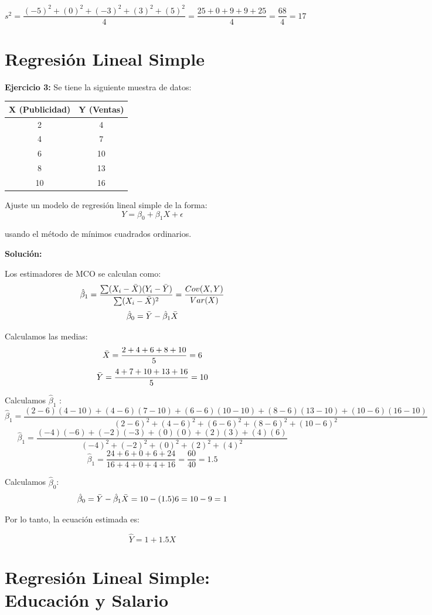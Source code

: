 \documentclass[10pt,a4paper]{article}
\begin{document}
$$s^2 = \frac{(-5)^2+(0)^2 + (-3)^2 +(3)^2 + (5)^2}{4} = \frac{25+0+9+9+25}{4} = \frac{68}{4} = 17$$



\section{Regresión Lineal Simple}

\textbf{Ejercicio 3:} Se tiene la siguiente muestra de datos:
\begin{center}
\begin{tabular}{|c|c|}
\hline
X (Publicidad) & Y (Ventas) \\
\hline
2 & 4 \\
\hline
4 & 7 \\
\hline
6 & 10 \\
\hline
8 & 13 \\
\hline
10 & 16 \\
\hline
\end{tabular}
\end{center}

Ajuste un modelo de regresión lineal simple de la forma:
$$Y = \beta_0 + \beta_1 X + \epsilon $$

usando el método de mínimos cuadrados ordinarios.

\textbf{Solución:}

Los estimadores de MCO se calculan como:
$$\hat{\beta}_1 = \frac{\sum (X_i - \Bar{X})(Y_i - \Bar{Y})}{\sum (X_i - \Bar{X})^2} = \frac{Cov(X,Y)}{Var(X)} $$
$$\hat{\beta}_0  = \Bar{Y} - \hat{\beta}_1 \Bar{X}$$

Calculamos las medias:
$$\Bar{X} = \frac{2+4+6+8+10}{5}=6$$ 
$$\Bar{Y} = \frac{4+7+10+13+16}{5} = 10$$

Calculamos $\hat{\beta}_1$ :
$$\hat{\beta}_1 = \frac{(2-6)(4-10)+(4-6)(7-10)+(6-6)(10-10)+(8-6)(13-10) + (10-6)(16-10)}{(2-6)^2+(4-6)^2+(6-6)^2+(8-6)^2+(10-6)^2}$$
$$\hat{\beta}_1 = \frac{(-4)(-6)+(-2)(-3)+(0)(0)+(2)(3)+(4)(6)}{(-4)^2+(-2)^2+(0)^2+(2)^2+(4)^2}$$
$$\hat{\beta}_1 = \frac{24+6+0+6+24}{16+4+0+4+16}= \frac{60}{40} = 1.5$$

Calculamos $\hat{\beta}_0$:
$$\hat{\beta}_0 = \Bar{Y} - \hat{\beta}_1 \Bar{X} = 10-(1.5)6 = 10 -9 = 1$$

Por lo tanto, la ecuación estimada es:

$$\hat{Y} = 1+1.5X$$

\section{Regresión Lineal Simple: Educación y Salario}
\end{document}
